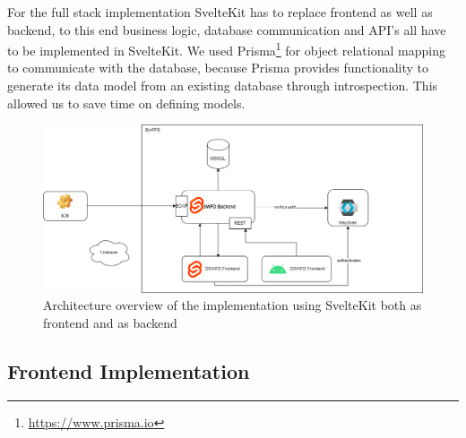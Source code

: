 For the full stack implementation SvelteKit has to replace frontend as well as backend, to this end business logic, database communication and API's all have to be implemented in SvelteKit. We used Prisma\footnote{\url{https://www.prisma.io}} for object relational mapping to communicate with the database, because Prisma provides functionality to generate its data model from an existing database through introspection. This allowed us to save time on defining models. 

\begin{figure}[ht]
    \centering
    \includegraphics[width=.8\linewidth]{assets/dswfd-architecture-fullstack}
    \caption{Architecture overview of the implementation using SvelteKit both as frontend and as backend}
    \label{fig:dswfd-architecture-fullstack}
\end{figure}

\subsection{Frontend Implementation}

          

